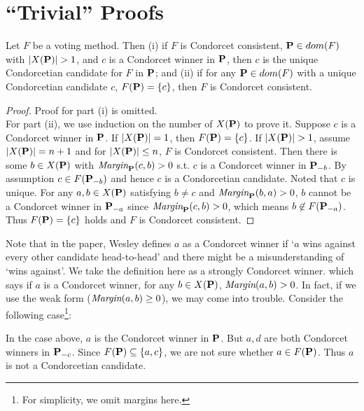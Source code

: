\chapter{``Trivial'' Proofs}

\begin{lemma}
    Let $F$ be a voting method. Then (i) if $F$ is Condorcet consistent, $\mathbf{P} \in dom(F)$ with $|X(\mathbf{P})| > 1$, and $c$ is a Condorcet winner in $\mathbf{P}$, then $c$ is the unique Condorcetian candidate for $F$ in $\mathbf{P}$; and (ii) if for any $\mathbf{P} \in dom(F)$ with a unique Condorcetian candidate $c$, $F(\mathbf{P}) = \{c\}$, then $F$ is Condorcet consistent.
\end{lemma}

\begin{proof}
    Proof for part (i) is omitted.\\
    For part (ii), we use induction on the number of $X(\mathbf{P})$ to prove it. Suppose $c$ is a Condorcet winner in $\mathbf{P}$. If $|X(\mathbf{P})| = 1$, then $F(\mathbf{P}) = \{c\}$. If $|X(\mathbf{P})| > 1$, assume $|X(\mathbf{P})| = n+1$ and for $|X(\mathbf{P})| \leq n$, $F$ is Condorcet consistent. Then there is some $b \in X(\mathbf{P})$ with $\textit{Margin}_{\mathbf{P}}(c,b) > 0$ s.t. $c$ is a Condorcet winner in $\mathbf{P}_{-b}$. By assumption $c \in F(\mathbf{P}_{-b})$ and hence $c$ is a Condorcetian candidate. Noted that $c$ is unique. For any $a,b \in X(\mathbf{P})$ satisfying $b \neq c$ and $\textit{Margin}_{\mathbf{P}}(b,a) > 0$, $b$ cannot be a Condorcet winner in $\mathbf{P}_{-a}$ since $\textit{Margin}_{\mathbf{P}}(c,b)>0$, which means $b \not \in F(\mathbf{P}_{-a})$. Thus $F(\mathbf{P}) = \{c\}$ holds and $F$ is Condorcet consistent. 
\end{proof}

Note that in the paper, Wesley defines $a$ as a Condorcet winner if `$a$ wins against every other candidate head-to-head' and there might be a misunderstanding of `wins against'. We take the definition here as a strongly Condorcet winner. which says if $a$ is a Condorcet winner, for any $b \in X(\mathbf{P})$, $\textit{Margin}(a,b) > 0$. In fact, if we use the weak form ($\textit{Margin}(a,b) \geq 0$), we may come into trouble. Consider the following case\footnote{For simplicity, we omit margins here.}:

\begin{center}
\end{center}

In the case above, $a$ is the Condorcet winner in $\mathbf{P}$. But $a,d$ are both Condorcet winners in $\mathbf{P}_{-c}$. Since $F(\mathbf{P}) \subseteq \{a,c\}$, we are not sure whether $a \in F(\mathbf{P})$. Thus $a$ is not a Condorcetian candidate.